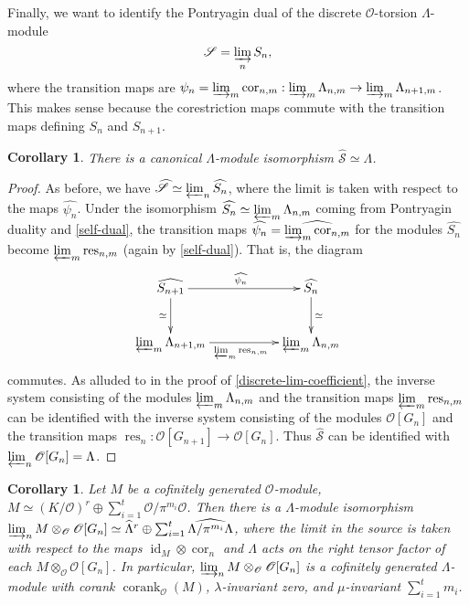 \documentclass[12 pt]{amsart}
\theoremstyle{plain}
\newtheorem{cor}[thm]{Corollary}
\theoremstyle{definition}
\numberwithin{equation}{section}
\numberwithin{table}{section}
\begin{document}
\indent Finally, we want to identify the Pontryagin dual of the discrete $\mathscr{O}$-torsion $\Lambda$-module 
\begin{equation*}
\mathscr{S}=\varinjlim_n S_n\text{,}
\end{equation*}
where the transition maps are $\psi_n=\varinjlim_m\operatorname{cor}_{n,m}:\varinjlim_m\Lambda_{n,m}\rightarrow\varinjlim_m\Lambda_{n+1,m}$. This makes sense because the corestriction maps commute with the transition maps defining $S_n$ and $S_{n+1}$.
\begin{cor}
\label{double-lim}
There is a canonical $\Lambda$-module isomorphism $\widehat{\mathscr{S}}\simeq\Lambda$.
\end{cor}
\begin{proof}
As before, we have $\widehat{\mathscr{S}}\simeq\varprojlim_n\widehat{S_n}$, where the limit is taken with respect to the maps $\widehat{\psi_n}$. Under the isomorphism $\widehat{S_n}\simeq\varprojlim_m\Lambda_{n,m}$ coming from Pontryagin duality and \cref{self-dual}, the transition maps $\widehat{\psi_n}=\widehat{\varinjlim_m\operatorname{cor}_{n,m}}$ for the modules $\widehat{S_n}$ become $\varprojlim_m\operatorname{res}_{n,m}$ (again by \cref{self-dual}). That is, the diagram
\begin{equation*}
\xymatrix{\widehat{S_{n+1}}\ar[d]_\simeq  \ar[rr]^{\widehat{\psi_n}} & &\widehat{S_n}\ar[d]^\simeq\\
\varprojlim_m\Lambda_{n+1,m} \ar[rr]_{\varprojlim_m\operatorname{res}_{n,m}} & &\varprojlim_m\Lambda_{n,m}}
\end{equation*}
commutes. As alluded to in the proof of \cref{discrete-lim-coefficient}, the inverse system consisting of the modules $\varprojlim_m\Lambda_{n,m}$ and the transition maps $\varprojlim_m\operatorname{res}_{n,m}$ can be identified with the inverse system consisting of the modules $\mathscr{O}[G_n]$ and the transition maps $\operatorname{res}_n:\mathscr{O}[G_{n+1}]\rightarrow\mathscr{O}[G_n]$. Thus $\widehat{\mathscr{S}}$ can be identified with $\varprojlim_n\mathscr{O}[G_n]=\Lambda$.
\end{proof}
\begin{cor}
\label{tensor-module}
Let $M$ be a cofinitely generated $\mathscr{O}$-module, $M\simeq (K/\mathscr{O})^r\oplus\sum_{i=1}^t\mathscr{O}/\pi^{m_i}\mathscr{O}$. Then there is a $\Lambda$-module isomorphism $\varinjlim_n M\otimes_\mathscr{O}\mathscr{O}[G_n]\simeq\widehat{\Lambda}^r\oplus\sum_{i=1}^t\widehat{\Lambda/\pi^{m_i}\Lambda}$, where the limit in the source is taken with respect to the maps $\operatorname{id}_M\otimes\operatorname{cor}_n$ and $\Lambda$ acts on the right tensor factor of each $M\otimes_\mathscr{O}\mathscr{O}[G_n]$. In particular, $\varinjlim_n M\otimes_\mathscr{O}\mathscr{O}[G_n]$ is a cofinitely generated $\Lambda$-module with corank $\operatorname{corank}_\mathscr{O}(M)$, $\lambda$-invariant zero, and $\mu$-invariant $\sum_{i=1}^tm_i$.
\end{cor}
\end{document}
